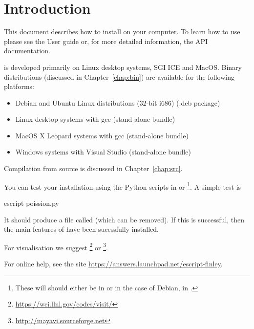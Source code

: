 

%
%
%

\section*{Introduction}
This document describes how to install \esfinley on your computer.
To learn how to use \esfinley please see the User guide or, for
more detailed information, the API documentation.

\esfinley is developed primarily on Linux desktop systems,  SGI ICE and MacOS.
Binary distributions (discussed in Chapter~\ref{chap:bin}) are available for the following platforms:
\begin{itemize}
\item Debian and Ubuntu Linux distributions ($32$-bit i686) (.deb package)
\item Linux desktop systems with gcc (stand-alone bundle)
\item MacOS X Leopard systems with gcc (stand-alone bundle)
\item Windows systems with Visual Studio (stand-alone bundle) 
\end{itemize}

Compilation from source is discussed in Chapter~\ref{chap:src}.

You can test your installation using the Python scripts in  or 
\footnote{These will should either be in  or in the case of Debian, in .}.
A simple test is
\begin{shellCode}
 escript poission.py
\end{shellCode}
It should produce a file called  (which can be removed).
If this is successful, then the main features of \escript have been sucessfully installed.

For visualisation we suggest \footnote{\url{https://wci.llnl.gov/codes/visit/}} or \footnote{\url{http://mayavi.sourceforge.net}}.

For online help, see the site \url{https://answers.launchpad.net/escript-finley}.